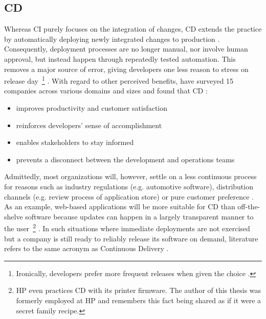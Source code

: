 \begin{appendices}
\subsection{\acl{CD}}
\label{sec:continuous-deployment}

Whereas \ac{CI} purely focuses on the integration of changes, \ac{CD} extends the practice by automatically deploying newly integrated changes to production \cite[p.~64]{leppanen2015highways} \cite[p.~21]{savor2016continuous}. Consequently, deployment processes are no longer manual, nor involve human approval, but instead happen through repeatedly tested automation. This removes a major source of error, giving developers one less reason to stress on release day~\footnote{Ironically, developers prefer more frequent releases when given the choice \cite[p.~21]{savor2016continuous}.} \cite[pp.~79--80]{virmani2015understanding} \cite[p.~53]{chen2015continuous}. With regard to other perceived benefits, \citeauthor{leppanen2015highways} have surveyed 15 companies across various domains and sizes and found that \ac{CD} \cite[pp.~66--67]{leppanen2015highways}:

\begin{itemize}
  \item improves productivity and customer satisfaction
  \item reinforces developers' sense of accomplishment
  \item enables stakeholders to stay informed
  \item prevents a disconnect between the development and operations teams
\end{itemize}

Admittedly, most organizations will, however, settle on a less continuous process for reasons such as industry regulations (e.g. automotive software), distribution channels (e.g. review process of application store) or pure customer preference \cite[pp.~68--69]{leppanen2015highways}. As an example, web-based applications will be more suitable for \ac{CD} than off-the-shelve software because updates can happen in a largely transparent manner to the user~\footnote{\ac*{HP} even practices \ac{CD} with its printer firmware. The author of this thesis was formerly employed at \acs*{HP} and remembers this fact being shared as if it were a secret family recipe.} \cite[p.~22]{savor2016continuous}. In such situations where immediate deployments are not exercised but a company is still ready to reliably release its software on demand, literature refers to the same acronym as Continuous Delivery \cite[p.~50]{chen2015continuous}.


\end{appendices}
